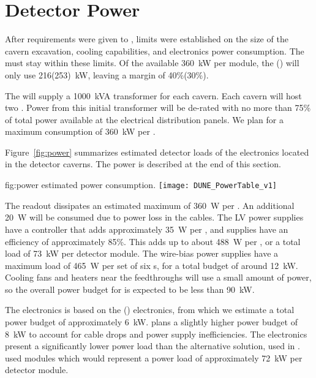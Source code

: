 \section{Detector Power}
\label{sec:fdsp-coord-faci-power}

After requirements were given to , 
limits were established on the size of the cavern excavation, cooling
capabilities, and electronics power consumption.   
The    must stay within these limits. Of the available 360~kW per module, the () will only use
216(253)~kW,  %
leaving a margin of 40\%(30\%).

The  will supply a 1000~kVA transformer for
each cavern.  Each cavern will host two   .  Power from
this initial transformer will be de-rated with no more than 75\%
of total power available at the electrical distribution panels.  We
plan for a maximum consumption of 360~kW per  .

Figure~\ref{fig:power} summarizes estimated detector loads of the 
 electronics located in the detector caverns.  The  power is 
described at the end of this section. 
\begin{dunefigure}
{fig:power}
{ estimated power consumption.}
  \texttt{[image: DUNE\_PowerTable\_v1]}
\end{dunefigure}


The  readout dissipates an estimated maximum of 360~W
per . An additional 20~W will be consumed due to power loss in the
cables.  The LV power supplies have a controller that adds
approximately 35~W per , and supplies have an efficiency of
approximately 85\%. This adds up to about 488~W per , or a
total load of 73~kW per detector module. The  wire-bias power
supplies have a maximum load of 465~W per set of six s, for a total
budget of around 12~kW. Cooling fans and heaters near the feedthroughs
will use a %
small amount of power, so the overall power budget for
 is expected to be less than 90~kW.

The  electronics is based on the  () electronics, from which we  estimate a
total power budget of approximately 6~kW.  plans a slightly higher power budget of
8~kW to account for cable drops and power supply inefficiencies.  The  
electronics present a significantly lower power load than the
alternative solution, used in .   used 
modules which would represent a power load of approximately 72~kW per
detector module. 

